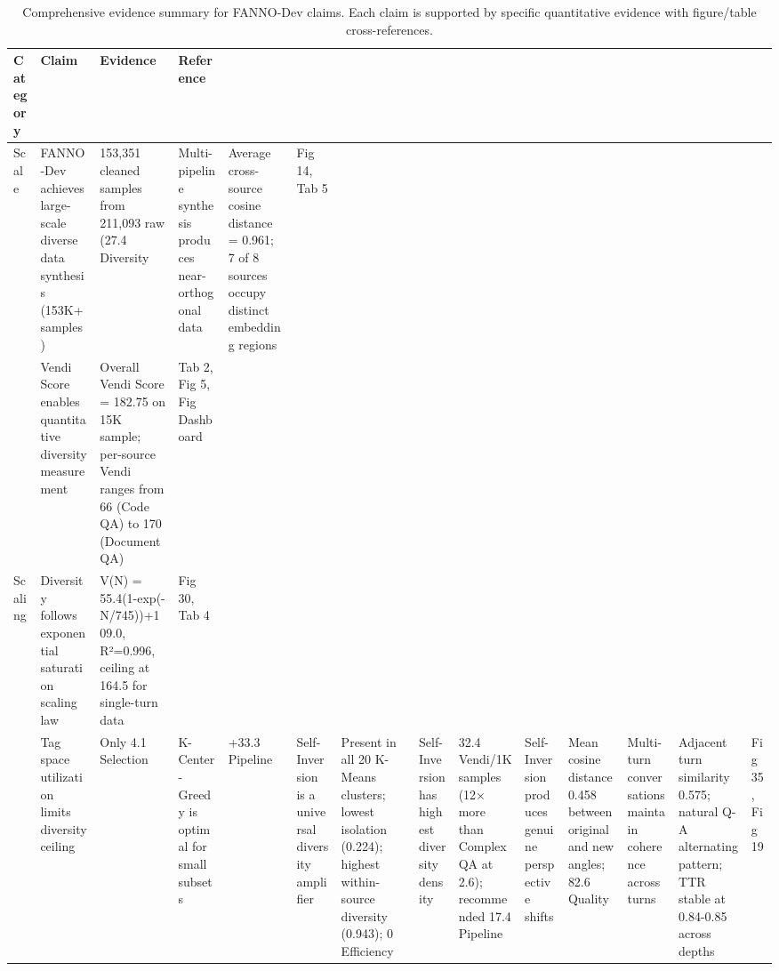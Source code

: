 \begin{table}[t]
\centering
\caption{Comprehensive evidence summary for FANNO-Dev claims. Each claim is supported by specific quantitative evidence with figure/table cross-references.}
\label{tab:evidence_summary}
\scriptsize
\begin{tabular}{p{}p{}p{}p{}}
\toprule
\textbf{Category} & \textbf{Claim} & \textbf{Evidence} & \textbf{Reference} \\
\midrule
Scale & FANNO-Dev achieves large-scale diverse data synthesis (153K+ samples) & 153,351 cleaned samples from 211,093 raw (27.4%
\midrule
Diversity & Multi-pipeline synthesis produces near-orthogonal data & Average cross-source cosine distance = 0.961; 7 of 8 sources occupy distinct embedding regions & Fig 14, Tab 5 \\
 & Vendi Score enables quantitative diversity measurement & Overall Vendi Score = 182.75 on 15K sample; per-source Vendi ranges from 66 (Code QA) to 170 (Document QA) & Tab 2, Fig 5, Fig Dashboard \\
\midrule
Scaling & Diversity follows exponential saturation scaling law & V(N) = 55.4(1-exp(-N/745))+109.0, R²=0.996, ceiling at 164.5 for single-turn data & Fig 30, Tab 4 \\
 & Tag space utilization limits diversity ceiling & Only 4.1%
\midrule
Selection & K-Center-Greedy is optimal for small subsets & +33.3%
\midrule
Pipeline & Self-Inversion is a universal diversity amplifier & Present in all 20 K-Means clusters; lowest isolation (0.224); highest within-source diversity (0.943); 0%
\midrule
Efficiency & Self-Inversion has highest diversity density & 32.4 Vendi/1K samples (12× more than Complex QA at 2.6); recommended 17.4%
\midrule
Pipeline & Self-Inversion produces genuine perspective shifts & Mean cosine distance 0.458 between original and new angles; 82.6%
\midrule
Quality & Multi-turn conversations maintain coherence across turns & Adjacent turn similarity 0.575; natural Q-A alternating pattern; TTR stable at 0.84-0.85 across depths & Fig 35, Fig 19 \\

\end{tabular}
\end{table}
